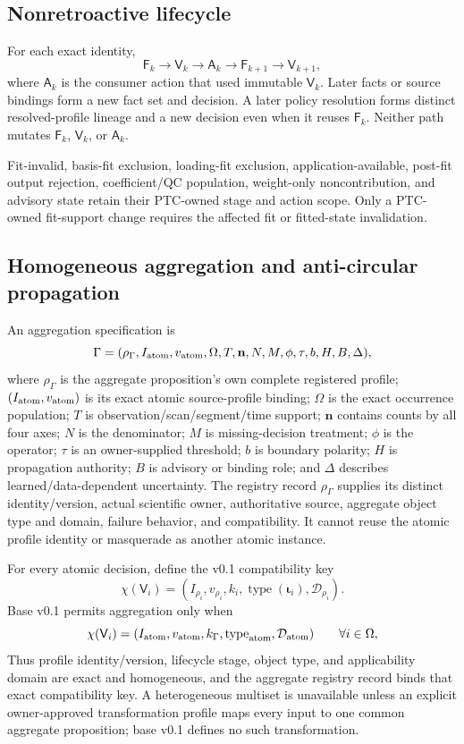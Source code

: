 \subsection{Nonretroactive lifecycle}

For each exact identity,
\[
 \mathsf F_k\longrightarrow\mathsf V_k\longrightarrow\mathsf A_k
 \longrightarrow\mathsf F_{k+1}\longrightarrow\mathsf V_{k+1},
\]
where $\mathsf A_k$ is the consumer action that used immutable
$\mathsf V_k$. Later facts or source bindings form a new fact set and
decision. A later policy resolution forms distinct resolved-profile lineage
and a new decision even when it reuses $\mathsf F_k$. Neither path mutates
$\mathsf F_k$, $\mathsf V_k$, or $\mathsf A_k$.

Fit-invalid, basis-fit exclusion, loading-fit exclusion,
application-available, post-fit output rejection, coefficient/QC population,
weight-only noncontribution, and advisory state retain their PTC-owned stage
and action scope. Only a PTC-owned fit-support change requires the affected
fit or fitted-state invalidation.

\subsection{Homogeneous aggregation and anti-circular propagation}
\label{sec:aggregation}

An aggregation specification is
\[
 \Gamma=(\rho_\Gamma,I_{\rm atom},v_{\rm atom},\Omega,T,\mathbf n,
          N,M,\phi,\tau,b,H,B,\Delta),
\]
where $\rho_\Gamma$ is the aggregate proposition's own complete registered
profile; $(I_{\rm atom},v_{\rm atom})$ is its exact atomic source-profile
binding; $\Omega$ is the exact occurrence population; $T$ is
observation/scan/segment/time support; $\mathbf n$ contains counts by all four
axes; $N$ is the denominator; $M$ is missing-decision treatment; $\phi$ is the
operator; $\tau$ is an owner-supplied threshold; $b$ is boundary polarity;
$H$ is propagation authority; $B$ is advisory or binding role; and $\Delta$
describes learned/data-dependent uncertainty. The registry record
$\rho_\Gamma$ supplies its distinct identity/version, actual scientific owner,
authoritative source, aggregate object type and domain, failure behavior, and
compatibility. It cannot reuse the atomic profile identity or masquerade as
another atomic instance.

For every atomic decision, define the v0.1 compatibility key
\[
 \chi(\mathsf V_i)=
 (I_{\rho_i},v_{\rho_i},k_i,\operatorname{type}(\boldsymbol\iota_i),
  \mathcal D_{\rho_i}).
\]
Base v0.1 permits aggregation only when
\[
 \chi(\mathsf V_i)=
 (I_{\rm atom},v_{\rm atom},k_\Gamma,
  \operatorname{type}_{\rm atom},\mathcal D_{\rm atom})
 \qquad\forall i\in\Omega,
\]
Thus profile identity/version, lifecycle stage, object type, and applicability
domain are exact and homogeneous, and the aggregate registry record binds
that exact compatibility key. A heterogeneous multiset is unavailable
unless an explicit owner-approved transformation profile maps every input to
one common aggregate proposition; base v0.1 defines no such transformation.

